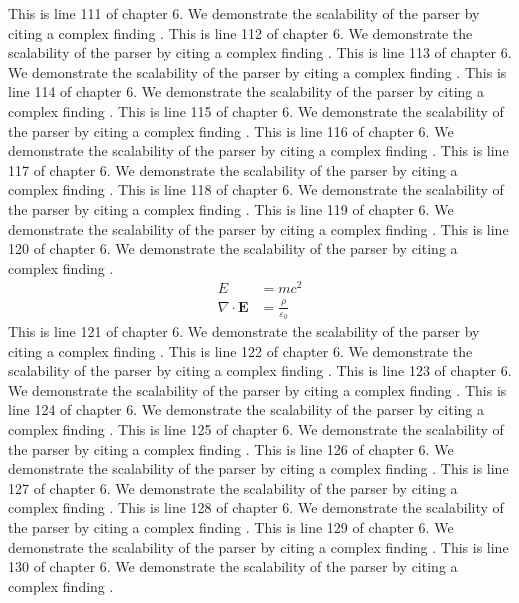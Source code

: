 This is line 111 of chapter 6. We demonstrate the scalability of the parser by citing a complex finding \cite{ref6_111}.
This is line 112 of chapter 6. We demonstrate the scalability of the parser by citing a complex finding \cite{ref6_112}.
This is line 113 of chapter 6. We demonstrate the scalability of the parser by citing a complex finding \cite{ref6_113}.
This is line 114 of chapter 6. We demonstrate the scalability of the parser by citing a complex finding \cite{ref6_114}.
This is line 115 of chapter 6. We demonstrate the scalability of the parser by citing a complex finding \cite{ref6_115}.
This is line 116 of chapter 6. We demonstrate the scalability of the parser by citing a complex finding \cite{ref6_116}.
This is line 117 of chapter 6. We demonstrate the scalability of the parser by citing a complex finding \cite{ref6_117}.
This is line 118 of chapter 6. We demonstrate the scalability of the parser by citing a complex finding \cite{ref6_118}.
This is line 119 of chapter 6. We demonstrate the scalability of the parser by citing a complex finding \cite{ref6_119}.
This is line 120 of chapter 6. We demonstrate the scalability of the parser by citing a complex finding \cite{ref6_120}.
\begin{align*}
  E &= mc^2 \\
  \nabla \cdot \mathbf{E} &= \frac{\rho}{\varepsilon_0}
\end{align*}
This is line 121 of chapter 6. We demonstrate the scalability of the parser by citing a complex finding \cite{ref6_121}.
This is line 122 of chapter 6. We demonstrate the scalability of the parser by citing a complex finding \cite{ref6_122}.
This is line 123 of chapter 6. We demonstrate the scalability of the parser by citing a complex finding \cite{ref6_123}.
This is line 124 of chapter 6. We demonstrate the scalability of the parser by citing a complex finding \cite{ref6_124}.
This is line 125 of chapter 6. We demonstrate the scalability of the parser by citing a complex finding \cite{ref6_125}.
This is line 126 of chapter 6. We demonstrate the scalability of the parser by citing a complex finding \cite{ref6_126}.
This is line 127 of chapter 6. We demonstrate the scalability of the parser by citing a complex finding \cite{ref6_127}.
This is line 128 of chapter 6. We demonstrate the scalability of the parser by citing a complex finding \cite{ref6_128}.
This is line 129 of chapter 6. We demonstrate the scalability of the parser by citing a complex finding \cite{ref6_129}.
This is line 130 of chapter 6. We demonstrate the scalability of the parser by citing a complex finding \cite{ref6_130}.
